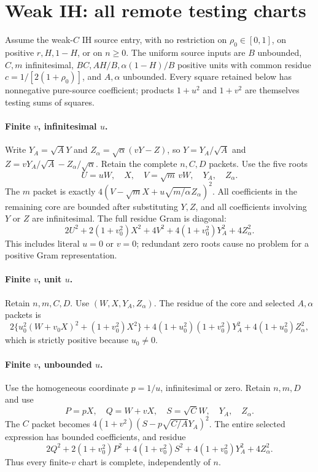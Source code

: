 \section{Weak IH: all remote testing charts}
\label{sec:weak-ih-remote}
Assume the weak-$C$ IH source entry, with no restriction on
$\rho_0\in[0,1]$, on positive $r,H,1-H$, or on $n\ge0$.
The uniform source inputs are $B$ unbounded, $C,m$ infinitesimal,
$BC,AH/B,\alpha(1-H)/B$ positive units with common residue
$c=1/[2(1+\rho_0)]$, and $A,\alpha$ unbounded.
Every square retained below has nonnegative pure-source coefficient;
products $1+u^2$ and $1+v^2$ are themselves testing sums of squares.

\paragraph{Finite $v$, infinitesimal $u$.}
Write $Y_A=\sqrt A Y$ and $Z_\alpha=\sqrt\alpha(vY-Z)$, so
$Y=Y_A/\sqrt A$ and $Z=vY_A/\sqrt A-Z_\alpha/\sqrt\alpha$.
Retain the complete $n,C,D$ packets. Use the five roots
\[
 U=uW,\quad X,\quad V=\sqrt m\,vW,\quad Y_A,\quad Z_\alpha.
\]
The $m$ packet is exactly
$4(V-\sqrt m X+u\sqrt{m/\alpha}Z_\alpha)^2$.
All coefficients in the remaining core are bounded after substituting
$Y,Z$, and all coefficients involving $Y$ or $Z$ are infinitesimal.
The full residue Gram is diagonal:
\[
 2U^2+2(1+v_0^2)X^2+4V^2
       +4(1+v_0^2)Y_A^2+4Z_\alpha^2.
\tag{IR1}
\]
This includes literal $u=0$ or $v=0$; redundant zero roots cause no
problem for a positive Gram representation.

\paragraph{Finite $v$, unit $u$.}
Retain $n,m,C,D$. Use $(W,X,Y_A,Z_\alpha)$.
The residue of the core and selected $A,\alpha$ packets is
\[
 2\{u_0^2(W+v_0X)^2+(1+v_0^2)X^2\}
       +4(1+u_0^2)(1+v_0^2)Y_A^2
       +4(1+u_0^2)Z_\alpha^2,
\tag{IR2}
\]
which is strictly positive because $u_0\ne0$.

\paragraph{Finite $v$, unbounded $u$.}
Use the homogeneous coordinate $p=1/u$, infinitesimal or zero.
Retain $n,m,D$ and use
\[
 P=pX,\quad Q=W+vX,\quad S=\sqrt C W,\quad Y_A,\quad Z_\alpha.
\]
The $C$ packet becomes
$4(1+v^2)(S-p\sqrt{C/A}Y_A)^2$.
The entire selected expression has bounded coefficients, and residue
\[
 2Q^2+2(1+v_0^2)P^2+4(1+v_0^2)S^2
       +4(1+v_0^2)Y_A^2+4Z_\alpha^2.
\tag{IR3}
\]
Thus every finite-$v$ chart is complete, independently of $n$.

